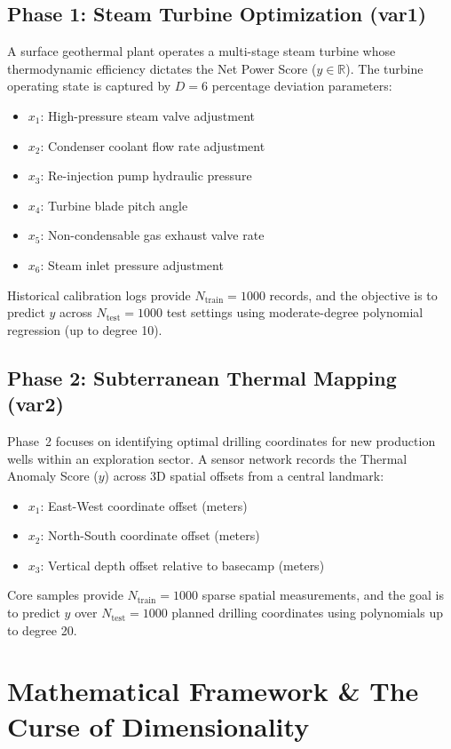 \documentclass[10pt,twocolumn]{article}
\begin{document}
\subsection{Phase 1: Steam Turbine Optimization (var1)}
A surface geothermal plant operates a multi-stage steam turbine whose thermodynamic efficiency dictates the Net Power Score ($y \in \mathbb{R}$). The turbine operating state is captured by $D=6$ percentage deviation parameters:
\begin{itemize}\setlength{\itemsep}{1pt}
    \item $x_1$: High-pressure steam valve adjustment
    \item $x_2$: Condenser coolant flow rate adjustment
    \item $x_3$: Re-injection pump hydraulic pressure
    \item $x_4$: Turbine blade pitch angle
    \item $x_5$: Non-condensable gas exhaust valve rate
    \item $x_6$: Steam inlet pressure adjustment
\end{itemize}
Historical calibration logs provide $N_{\text{train}}=1000$ records, and the objective is to predict $y$ across $N_{\text{test}}=1000$ test settings using moderate-degree polynomial regression (up to degree 10).

\subsection{Phase 2: Subterranean Thermal Mapping (var2)}
Phase~2 focuses on identifying optimal drilling coordinates for new production wells within an exploration sector. A sensor network records the Thermal Anomaly Score ($y$) across 3D spatial offsets from a central landmark:
\begin{itemize}\setlength{\itemsep}{1pt}
    \item $x_1$: East-West coordinate offset (meters)
    \item $x_2$: North-South coordinate offset (meters)
    \item $x_3$: Vertical depth offset relative to basecamp (meters)
\end{itemize}
Core samples provide $N_{\text{train}}=1000$ sparse spatial measurements, and the goal is to predict $y$ over $N_{\text{test}}=1000$ planned drilling coordinates using polynomials up to degree 20.

\section{Mathematical Framework \& The Curse of Dimensionality}
\end{document}
